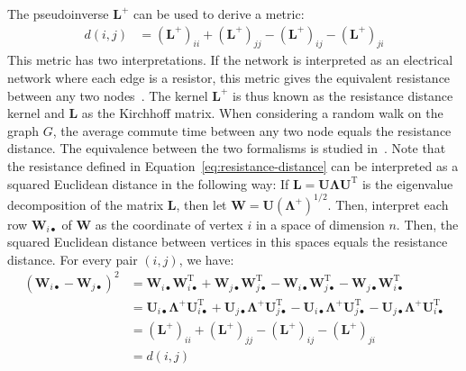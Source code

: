 \documentclass[11pt,a4paper]{book}
\begin{document}
The pseudoinverse $\mathbf L^+$ can be used to derive a metric:
\begin{align}
  d(i,j) &= (\mathbf L^+)_{ii} + (\mathbf L^+)_{jj} - (\mathbf L^+)_{ij}
  - (\mathbf L^+)_{ji}
  \label{eq:resistance-distance}
\end{align}
This metric has two interpretations.  If the network is interpreted as
an electrical network where each edge is a resistor, this metric gives the
equivalent resistance between any two nodes~\cite{b101}.  The kernel
$\mathbf L^+$ is thus known as the resistance distance kernel and
$\mathbf L$ as the 
Kirchhoff matrix.  When
considering a random walk on the graph $G$, the average commute
time between any two node equals the resistance distance.  
The equivalence between the two formalisms is studied in~\cite{b19}. 
Note that the resistance defined in
Equation~\ref{eq:resistance-distance} can be interpreted as a squared
Euclidean distance in the following way:  If $\mathbf L = \mathbf U
\mathbf \Lambda \mathbf U^{\mathrm T}$ is the eigenvalue decomposition
of the matrix $\mathbf L$, then let $\mathbf W = \mathbf U 
(\mathbf \Lambda^+)^{1/2}$.  Then, interpret each row $\mathbf W_{i\bullet}$ of
$\mathbf W$ as the coordinate of vertex $i$ in a space of dimension
$n$. Then, the squared Euclidean distance between vertices in this
spaces equals the resistance distance.  For every pair $(i,j)$, we have: 
\begin{align*}
  (\mathbf W_{i\bullet} - \mathbf W_{j\bullet})^2 
  &= \mathbf W_{i\bullet}^{\phantom{\mathrm I}} \mathbf
  W_{i\bullet}^{\mathrm T} 
  + \mathbf W_{j\bullet}^{\phantom{\mathrm I}} \mathbf W_{j\bullet}^{\mathrm T} 
  - \mathbf W_{i\bullet}^{\phantom{\mathrm I}} \mathbf
  W_{j\bullet}^{\mathrm T} 
  - \mathbf W_{j\bullet}^{\phantom{\mathrm I}} \mathbf
  W_{i\bullet}^{\mathrm T} \\ 
  &= \mathbf U_{i\bullet}^{\phantom{\mathrm I}} \mathbf \Lambda^+ \mathbf U_{i\bullet}^{\mathrm T}
  +  \mathbf U_{j\bullet}^{\phantom{\mathrm I}} \mathbf \Lambda^+ \mathbf U_{j\bullet}^{\mathrm T}
  -  \mathbf U_{i\bullet}^{\phantom{\mathrm I}} \mathbf \Lambda^+ \mathbf U_{j\bullet}^{\mathrm T}
  -  \mathbf U_{j\bullet}^{\phantom{\mathrm I}} \mathbf \Lambda^+ \mathbf
  U_{i\bullet}^{\mathrm T} \\
  &= (\mathbf L^+)_{ii} + (\mathbf L^+)_{jj} - (\mathbf L^+)_{ij} -
  (\mathbf L^+)_{ji}  \\
  &= d(i,j)
\end{align*}
\end{document}
